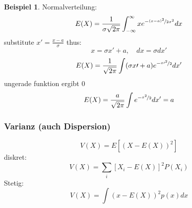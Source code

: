 \documentclass[a4paper]{article}
\theoremstyle{definition}
\newtheorem{beispiel}{Beispiel}%
\theoremstyle{remark}
\begin{document}
\begin{beispiel}
  
 Normalverteilung:\\
\begin{equation*}
  E(X)= \frac{1}{\sigma \sqrt{2\pi }}\int_{-\infty}^{\infty}xe^{-\nicefrac{(x-a)^2}{2\sigma ^2}}dx
\end{equation*}
    substitute
    $x'=\frac{x-a}{\sigma }$    thus:
    \begin{equation}
      x=\sigma x'+a , \quad dx=\sigma dx'
    \end{equation}
    \begin{equation}
      E(X)=\frac{1}{\sqrt{2\pi}}\int (\sigma x\prime+a)e^{-\nicefrac{ { x\prime}^2}{2}}dx'
    \end{equation}
    ungerade funktion ergibt 0
    \begin{equation*}
    E(X)=\frac{a}{\sqrt{2\pi}}\int e^{-\nicefrac{x^2}{2}}dx'=a
    \end{equation*}
    \subsubsection{Varianz (auch Dispersion)}
\label{ssub:varianz_auch_dispersion_}

  \begin{equation*}
    V(X)=E\left[  (X-E(X))^2\right] 
  \end{equation*}
  diskret:\\
  \begin{equation*}
    V(X)=\sum_i[X_i-E(X)]^2 P(X_i)
  \end{equation*}
  Stetig:
  \begin{equation*}
  V(X)=\int \left(  x-E(X)\right)^2 p(x)dx
  \end{equation*}

\end{beispiel}
\end{document}
